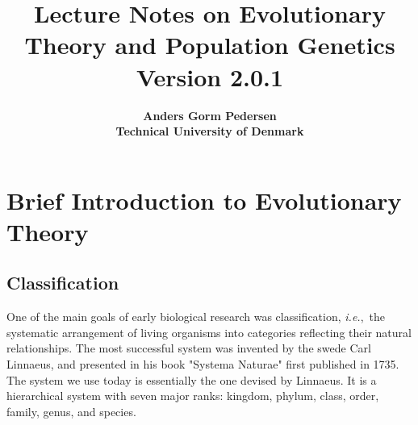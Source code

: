 \documentclass[11pt,a4paper]{book}
\newcommand{\ie}{\emph{i.e.},\ }
\begin{document}
\title{\Huge \bf Lecture Notes on Evolutionary Theory and Population Genetics\\{\Large Version 2.0.1} }
\author{\Large \bf Anders Gorm Pedersen\\Technical University of Denmark}
\maketitle

\fancyhead{}
\fancyfoot{}
\fancyhead[LE,RO]{\thepage}		
\renewcommand{\headrulewidth}{0.4pt}

\frontmatter
	\tableofcontents 

\mainmatter


\chapter{Brief Introduction to Evolutionary Theory}
		
\section{Classification}

One of the main goals of early biological research was classification, \ie the systematic arrangement of living organisms into categories reflecting their natural relationships. The most successful system was invented by the swede Carl Linnaeus, and presented in his book 
"Systema Naturae" first published in 1735. The system we use today is essentially the one devised by Linnaeus. It is a hierarchical system with seven major ranks: kingdom, phylum, class, order, family, genus, and species. 
\end{document}
